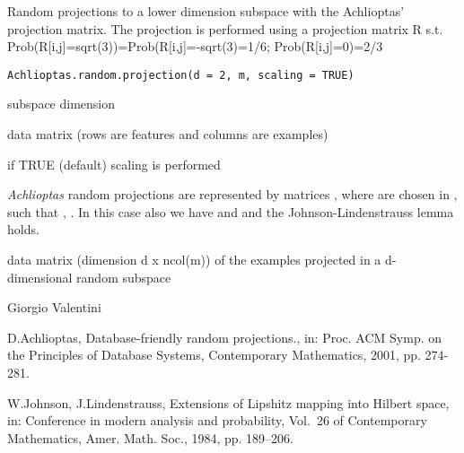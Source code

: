 \documentclass{article}
\begin{document}
\begin{Description}\relax
Random projections to a lower dimension subspace with the Achlioptas' projection matrix.
The projection is performed using a  projection matrix R s.t. Prob(R[i,j]=sqrt(3))=Prob(R[i,j]=-sqrt(3)=1/6;
Prob(R[i,j]=0)=2/3
\end{Description}
\begin{Usage}
\begin{verbatim}
Achlioptas.random.projection(d = 2, m, scaling = TRUE)
\end{verbatim}
\end{Usage}
\begin{Arguments}
\begin{ldescription}
\item[\code{d}] subspace dimension 
\item[\code{m}] data matrix (rows are features and columns are examples) 
\item[\code{scaling}] if TRUE (default) scaling is performed 
\end{ldescription}
\end{Arguments}
\begin{Details}\relax
\emph{Achlioptas} random projections are
represented by  matrices , where  
are  chosen in , such that 
, . 
In this case also we have  and   and the Johnson-Lindenstrauss lemma holds.
\end{Details}
\begin{Value}
data matrix (dimension d x ncol(m)) of the examples projected in a d-dimensional random subspace
\end{Value}
\begin{Author}\relax
Giorgio Valentini 
\end{Author}
\begin{References}\relax
D.Achlioptas, Database-friendly random projections., in: Proc. ACM Symp. on
the Principles of Database Systems, Contemporary Mathematics, 2001, pp.
274-281.

W.Johnson, J.Lindenstrauss, Extensions of Lipshitz mapping into Hilbert
space, in: Conference in modern analysis and probability, Vol.~26 of
Contemporary Mathematics, Amer. Math. Soc., 1984, pp. 189--206.
\end{References}
\end{document}
